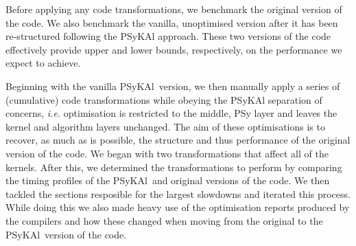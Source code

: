 \documentclass{IOS-Book-Article}
\newcommand{\psykal}{{PS}y{KA}l}
\begin{document}
Before applying any code transformations, we benchmark the original
version of the code. We also benchmark the vanilla, unoptimised
version after it has been re-structured following the \psykal
approach. These two versions of the code effectively provide upper and
lower bounds, respectively, on the performance we expect to achieve.

Beginning with the vanilla \psykal\ version, we then manually apply a
series of (cumulative) code transformations while obeying the \psykal
separation of concerns, {\it i.e.} optimisation is restricted to the
middle, {PS}y layer and leaves the kernel and algorithm layers
unchanged. The aim of these optimisations is to recover, as much as is
possible, the structure and thus performance of the original version
of the code. We began with two transformations that affect all of the
kernels. After this, we determined the transformations to perform by
comparing the timing profiles of the \psykal\ and original versions of
the code. We then tackled the sections resposible for the largest
slowdowns and iterated this process. While doing this we also made
heavy use of the optimisation reports produced by the compilers and
how these changed when moving from the original to the \psykal\ version
of the code.
\end{document}
